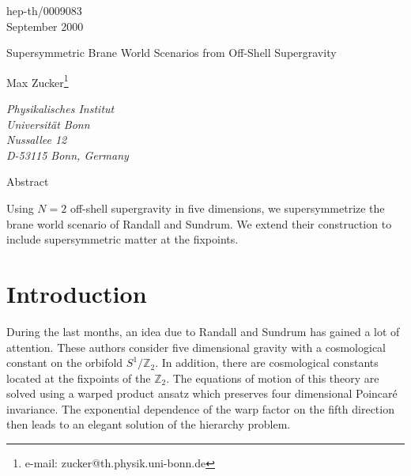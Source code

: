\documentclass[a4paper,12pt, twoside]{article}
\numberwithin{equation}{section}
\begin{document}
\begin{titlepage}
\begin{center}
\hspace{10cm} hep-th/0009083\\
\hspace{10cm} September 2000\\
\vspace*{2cm}

{ \huge Supersymmetric Brane World Scenarios from Off-Shell 
Supergravity}\\
\vspace{1cm}

{\sc Max Zucker}\footnote{e-mail: zucker@th.physik.uni-bonn.de}
\vspace{.2cm}

{\it { Physikalisches Institut \\
Universit\"at Bonn\\
Nussallee 12\\
D-53115 Bonn, Germany}}\\

\vspace{1.2cm}

\vspace{.3cm}

{\large Abstract}
\end{center}
%
Using $N=2$ off-shell supergravity in five dimensions, we 
supersymmetrize the brane world scenario of Randall and Sundrum. We extend their 
construction to include supersymmetric matter at the fixpoints.

%
%
\end{titlepage}
\section{Introduction}
During the last months, an idea due to Randall and Sundrum 
\cite{Randall:1999ee} has gained a lot of attention. These authors consider five 
dimensional gravity with a cosmological constant on the orbifold 
$S^1/\mathbb{Z}_2$. In addition, there are cosmological constants located at 
the fixpoints of the $\mathbb{Z}_2$. The equations of motion of this 
theory are solved using a warped product ansatz which preserves four 
dimensional Poincar\'e invariance. The exponential dependence of the warp 
factor on the fifth direction then leads to an elegant solution of the 
hierarchy problem. 
\end{document}
